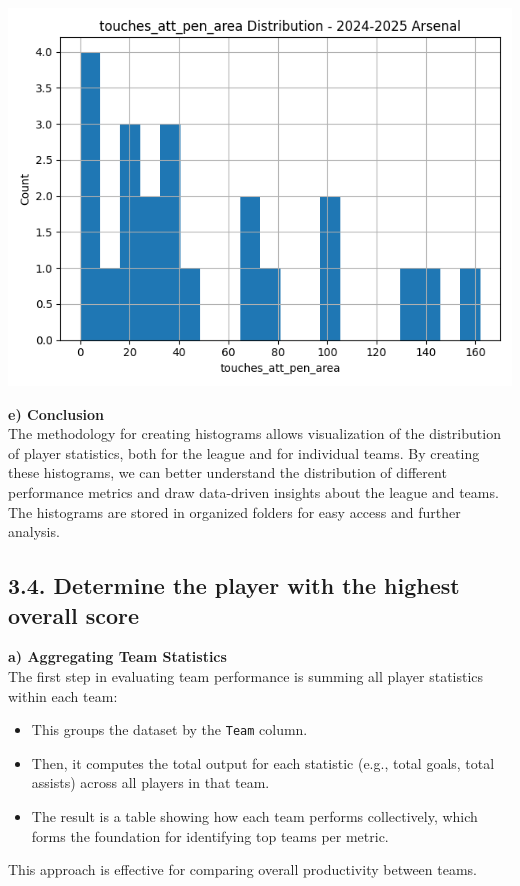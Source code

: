 \documentclass[a4paper,12pt]{article}
\begin{document}
\begin{center}
    \includegraphics[width=1\textwidth]{Arsenal__att_pen.png}
\end{center}

\textbf{e) Conclusion} \\
The methodology for creating histograms allows visualization of the distribution of player statistics, both for the league and for individual teams. By creating these histograms, we can better understand the distribution of different performance metrics and draw data-driven insights about the league and teams. The histograms are stored in organized folders for easy access and further analysis.

\subsection*{\textbf{\Large 3.4. Determine the player with the highest overall score}}

\textbf{a) Aggregating Team Statistics} \\
The first step in evaluating team performance is summing all player statistics within each team:
\begin{itemize}
    \item This groups the dataset by the \texttt{Team} column.
    \item Then, it computes the total output for each statistic (e.g., total goals, total assists) across all players in that team.
    \item The result is a table showing how each team performs collectively, which forms the foundation for identifying top teams per metric.
\end{itemize}
This approach is effective for comparing overall productivity between teams.
\end{document}
